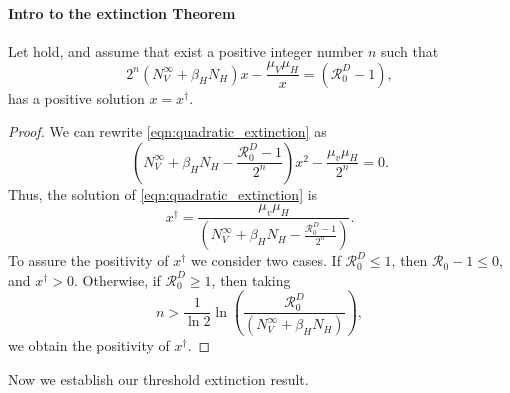 \paragraph{Intro to the extinction Theorem}
\begin{lemma}
    \label{lem:quadratic_equation}
    Let  hold, 
    and assume that exist a positive integer number $n$
    such that 
    \begin{equation}\label{eqn:quadratic_extinction}
        2^n
        \left(
             N_V^{\infty} +
            \beta_H N_H
        \right) x
        - \frac{\mu_V \mu_H}{x}
        =
        \left(
            \mathcal{R}_0^D -1
        \right),
    \end{equation}
    has a positive solution $x=x^\dagger$. 
\end{lemma}
%
\begin{proof}
    We can rewrite \eqref{eqn:quadratic_extinction} as
    \begin{equation*}
        \left(
             N_V ^ {\infty} +
            \beta_H N_H            
            -\frac{\mathcal{R}_0 ^ D - 1}{2 ^ n}
        \right) x ^ 2
        - \frac{\mu_v \mu_H}{2 ^ n}
        = 0.
    \end{equation*}
    Thus, the solution of \eqref{eqn:quadratic_extinction} is
    \begin{equation}
        \label{eqn:quadratic_solution}
        x^{\dagger} = 
            \frac{\mu_v \mu_H}{
                \left(
                     N_V ^ {\infty} +
                    \beta_H N_H
                    -\frac{\mathcal{R}_0 ^ D - 1}{2 ^ n}
                \right)
            }.
    \end{equation}
    To assure the positivity of $x^{\dagger}$ we consider two cases.
    If $\mathcal{R}_0 ^ D \leq 1$, 
    then $\mathcal{R}_0 - 1 \leq 0$, and $x^{\dagger} >0$.
    Otherwise, if $\mathcal{R}_0 ^ D \geq 1$,
    then taking 
    \begin{equation}
        \label{eqn:n_condition}
        n > \frac{1}{\ln 2} 
            \ln
            \left(
                \displaystyle
                \frac{\mathcal{R}_0 ^ D}{
                    \left(
                         N_V ^ {\infty} +
                        \beta_H N_H
                    \right)
                }    
            \right),
    \end{equation}
    we obtain the positivity of $x^{\dagger}$.
\end{proof}
%
%
%
Now we establish our threshold extinction result.
